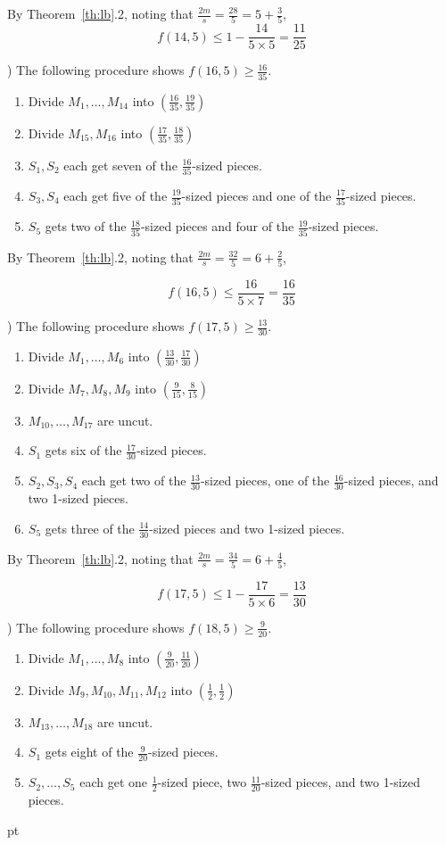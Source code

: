\documentclass[12pt]{article}
\newenvironment{proof}
    {\pagebreak[1]{\narrower\noindent {\bf Proof:\quad\nopagebreak}}}{\QED}
\newcommand{\yyskip}{\penalty-50\vskip 5pt plus 3pt minus 2pt}
\newcommand{\blackslug}{\hbox{\hskip 1pt
        \vrule width 4pt height 8pt depth 1.5pt\hskip 1pt}}
\newcommand{\QED}{{\penalty10000\parindent 0pt\penalty10000
        \hskip 8 pt\nolinebreak\blackslug\hfill\lower 8.5pt\null}
        \par\yyskip\pagebreak[1]}
\begin{document}
\begin{proof}
By Theorem~\ref{th:lb}.2, noting that $\frac{2m}{s}=\frac{28}{5}=5+\frac{3}{5}$,
$$f(14,5) \le 1-\frac{14}{5\times 5}=\frac{11}{25}$$

) The following procedure shows $f(16,5) \ge \frac{16}{35}$.

\begin{enumerate}
\item
Divide $M_1,\ldots,M_{14}$ into
$(\frac{16}{35},\frac{19}{35})$
\item
Divide $M_{15},M_{16}$ into
$(\frac{17}{35},\frac{18}{35})$
\item
$S_1,S_2$ each get seven of the $\frac{16}{35}$-sized pieces.
\item
$S_3,S_4$ each get five of the $\frac{19}{35}$-sized pieces and
one of the $\frac{17}{35}$-sized pieces.
\item
$S_5$ gets two of the $\frac{18}{35}$-sized pieces and four of the
$\frac{19}{35}$-sized pieces.
\end{enumerate}

By Theorem~\ref{th:lb}.2, noting that $\frac{2m}{s}=\frac{32}{5}=6+\frac{2}{5}$,

$$f(16,5) \le \frac{16}{5\times 7} = \frac{16}{35}$$

) The following procedure shows $f(17,5) \ge \frac{13}{30}$.

\begin{enumerate}
\item
Divide $M_1,\ldots,M_6$ into
$(\frac{13}{30},\frac{17}{30})$
\item
Divide $M_7,M_8,M_{9}$ into
$(\frac{9}{15},\frac{8}{15})$
\item
$M_{10},\ldots,M_{17}$ are uncut.
\item
$S_1$ gets six of the $\frac{17}{30}$-sized pieces.
\item
$S_2,S_3,S_4$ each get two of the $\frac{13}{30}$-sized pieces, one of
the $\frac{16}{30}$-sized pieces, and two 1-sized pieces.
\item
$S_5$ gets three of the $\frac{14}{30}$-sized pieces and two 1-sized pieces.
\end{enumerate}

By Theorem~\ref{th:lb}.2, noting that $\frac{2m}{s}=\frac{34}{5}=6+\frac{4}{5}$,

$$f(17,5) \le 1-\frac{17}{5\times 6} = \frac{13}{30}$$

) The following procedure shows $f(18,5) \ge \frac{9}{20}$.

\begin{enumerate}
\item
Divide $M_1,\ldots,M_8$ into
$(\frac{9}{20},\frac{11}{20})$
\item
Divide $M_9,M_{10},M_{11},M_{12}$ into
$(\frac{1}{2},\frac{1}{2})$
\item
$M_{13},\ldots,M_{18}$ are uncut.
\item
$S_1$ gets eight of the $\frac{9}{20}$-sized pieces.
\item
$S_2,\ldots,S_5$ each get one $\frac{1}{2}$-sized piece, two
$\frac{11}{20}$-sized pieces, and two 1-sized pieces.
\end{enumerate}


\end{proof}
\end{document}

